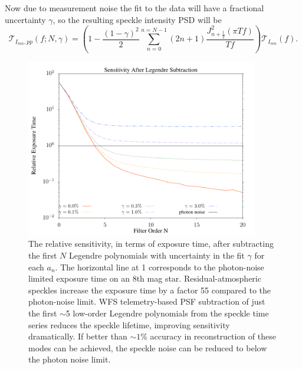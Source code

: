\documentclass[10pt,preprint]{aastex631}
\begin{document}

Now due to measurement noise the fit to the data will have a fractional uncertainty $\gamma$, so the resulting speckle intensity PSD will be
\begin{equation}
\mathcal{T}_{I_{mn},pp}(f;N,\gamma) = \left( 1 -  \frac{(1-\gamma)^2}{2}\sum_{n=0}^{n=N-1}  (2n+1) \frac{J_{n+\frac{1}{2}}^2(\pi T f)}{T f}\right) \mathcal{T}_{I_{mn}}(f).
\end{equation}

\begin{figure}
\centering
\includegraphics[width=4in]{relsens.pdf}
\caption{The relative sensitivity, in terms of exposure time, after subtracting the first $N$ Legendre polynomials with uncertainty in the fit $\gamma$ for each $a_n$.  The horizontal line at 1 corresponds to the photon-noise limited exposure time on an 8th mag star.  Residual-atmospheric speckles increase the exposure time by a factor 55 compared to the photon-noise limit.   
WFS telemetry-based PSF subtraction of just the first $\sim$5 low-order Legendre polynomials from the speckle time series reduces the speckle lifetime, improving sensitivity dramatically. If better than $\sim$$1\%$ accuracy in reconstruction of these modes can be achieved, the speckle noise can be reduced to below the photon noise limit. \label{fig:legrelsens}}
\end{figure}
\end{document}
